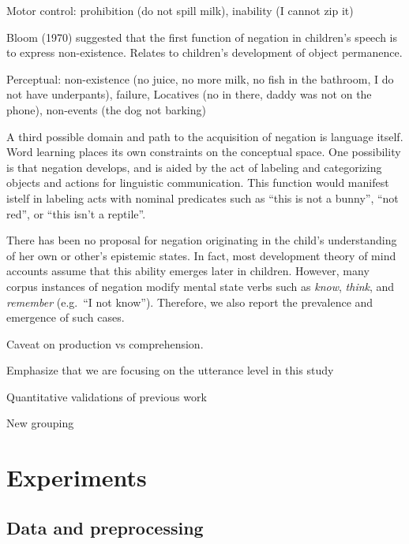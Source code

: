\documentclass[10pt, letterpaper]{article}
\begin{document}
Motor control: prohibition (do not spill milk), inability (I cannot zip
it)

Bloom (1970) suggested that the first function of negation in children's
speech is to express non-existence. Relates to children's development of
object permanence.

Perceptual: non-existence (no juice, no more milk, no fish in the
bathroom, I do not have underpants), failure, Locatives (no in there,
daddy was not on the phone), non-events (the dog not barking)

A third possible domain and path to the acquisition of negation is
language itself. Word learning places its own constraints on the
conceptual space. One possibility is that negation develops, and is
aided by the act of labeling and categorizing objects and actions for
linguistic communication. This function would manifest istelf in
labeling acts with nominal predicates such as ``this is not a bunny'',
``not red'', or ``this isn't a reptile''.

There has been no proposal for negation originating in the child's
understanding of her own or other's epistemic states. In fact, most
development theory of mind accounts assume that this ability emerges
later in children. However, many corpus instances of negation modify
mental state verbs such as \emph{know}, \emph{think}, and
\emph{remember} (e.g.~``I not know''). Therefore, we also report the
prevalence and emergence of such cases.

Caveat on production vs comprehension.

Emphasize that we are focusing on the utterance level in this study

Quantitative validations of previous work

New grouping

\hypertarget{experiments}{%
\section{Experiments}\label{experiments}}

\hypertarget{data-and-preprocessing}{%
\subsection{Data and preprocessing}\label{data-and-preprocessing}}
\end{document}
